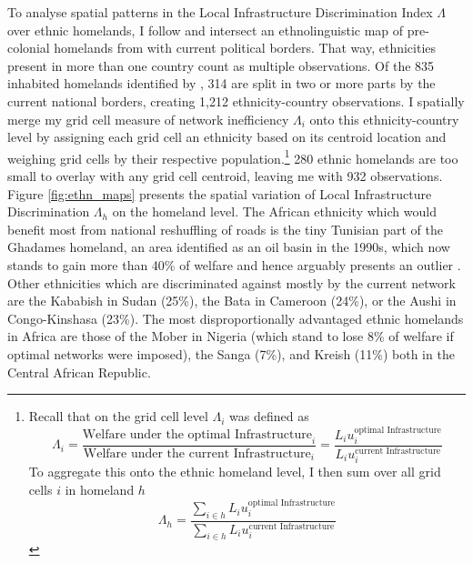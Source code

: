 \documentclass[11pt, oneside]{article}   	%
\begin{document}
To analyse spatial patterns in the Local Infrastructure Discrimination Index $\Lambda$ over ethnic homelands, I follow \cite{michalopoulos_long-run_2016} and intersect an ethnolinguistic map of pre-colonial homelands from \cite{Murdock_Africaitspeoples_1959} with current political borders. That way, ethnicities present in more than one country count as multiple observations. Of the 835 inhabited homelands identified by \citeauthor{Murdock_Africaitspeoples_1959}, 314 are split in two or more parts by the current national borders, creating 1,212 ethnicity-country observations. I spatially merge my grid cell measure of network inefficiency $\Lambda_{i}$ onto this ethnicity-country level by assigning each grid cell an ethnicity based on its centroid location and weighing grid cells by their respective population.\footnote{Recall that on the grid cell level $\Lambda_{i}$ was defined as \begin{equation*}
  \Lambda_{i} = \frac{\textrm{Welfare under the optimal Infrastructure}_{i}}{\textrm{Welfare under the current Infrastructure}_{i}} = \frac{L_{i}u_{i}^{\textrm{optimal Infrastructure}}}{L_{i}u_{i}^{\textrm{current Infrastructure}}}
\end{equation*} To aggregate this onto the ethnic homeland level, I then sum over all grid cells $i$ in homeland $h$ \begin{equation*}
  \Lambda_{h} = \frac{\sum_{i \in h}^{} L_{i}u_{i}^{\textrm{optimal Infrastructure}}}{\sum_{i \in h}^{}L_{i}u_{i}^{\textrm{current Infrastructure}}}
\end{equation*}} 280 ethnic homelands are too small to overlay with any grid cell centroid, leaving me with 932 observations. Figure \eqref{fig:ethn_maps} presents the spatial variation of Local Infrastructure Discrimination $\Lambda_{h}$ on the homeland level. The African ethnicity which would benefit most from national reshuffling of roads is the tiny Tunisian part of the Ghadames homeland, an area identified as an oil basin in the 1990s, which now stands to gain more than 40\% of welfare and hence arguably presents an outlier \citep{Echikh_Geologyhydrocarbonoccurrences_1998}. Other ethnicities which are discriminated against mostly by the current network are the Kababish in Sudan (25\%), the Bata in Cameroon (24\%), or the Aushi in Congo-Kinshasa (23\%). The most disproportionally advantaged ethnic homelands in Africa are those of the Mober in Nigeria (which stand to lose 8\% of welfare if optimal networks were imposed), the Sanga (7\%), and Kreish (11\%) both in the Central African Republic.
\end{document}
